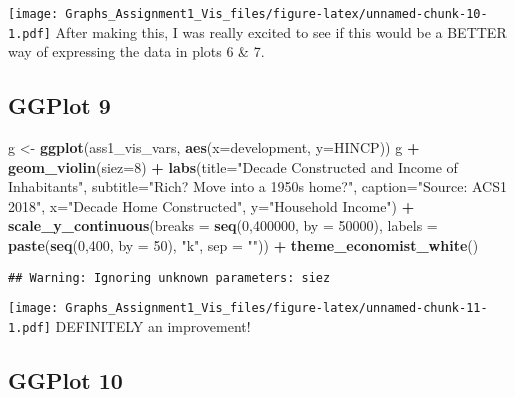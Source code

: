 \documentclass[
]{article}
\newenvironment{Shaded}{\begin{snugshade}}{\end{snugshade}}
\newcommand{\DataTypeTok}[1]{\textcolor[rgb]{0.13,0.29,0.53}{#1}}
\newcommand{\DecValTok}[1]{\textcolor[rgb]{0.00,0.00,0.81}{#1}}
\newcommand{\KeywordTok}[1]{\textcolor[rgb]{0.13,0.29,0.53}{\textbf{#1}}}
\newcommand{\NormalTok}[1]{#1}
\newcommand{\OperatorTok}[1]{\textcolor[rgb]{0.81,0.36,0.00}{\textbf{#1}}}
\newcommand{\StringTok}[1]{\textcolor[rgb]{0.31,0.60,0.02}{#1}}
\begin{document}
\texttt{[image: Graphs\_Assignment1\_Vis\_files/figure-latex/unnamed-chunk-10-1.pdf]}
After making this, I was really excited to see if this would be a BETTER
way of expressing the data in plots 6 \& 7.

\hypertarget{ggplot-9}{%
\subsection{GGPlot 9}\label{ggplot-9}}

\begin{Shaded}
\begin{Highlighting}[]
\NormalTok{g <-}\StringTok{ }\KeywordTok{ggplot}\NormalTok{(ass1_vis_vars, }\KeywordTok{aes}\NormalTok{(}\DataTypeTok{x=}\NormalTok{development, }\DataTypeTok{y=}\NormalTok{HINCP))}
\NormalTok{g }\OperatorTok{+}\StringTok{ }\KeywordTok{geom_violin}\NormalTok{(}\DataTypeTok{siez=}\DecValTok{8}\NormalTok{) }\OperatorTok{+}\StringTok{ }
\StringTok{  }\KeywordTok{labs}\NormalTok{(}\DataTypeTok{title=}\StringTok{"Decade Constructed and Income of Inhabitants"}\NormalTok{, }
       \DataTypeTok{subtitle=}\StringTok{"Rich? Move into a 1950s home?"}\NormalTok{,}
       \DataTypeTok{caption=}\StringTok{"Source: ACS1 2018"}\NormalTok{,}
       \DataTypeTok{x=}\StringTok{"Decade Home Constructed"}\NormalTok{,}
       \DataTypeTok{y=}\StringTok{"Household Income"}\NormalTok{) }\OperatorTok{+}
\StringTok{  }\KeywordTok{scale_y_continuous}\NormalTok{(}\DataTypeTok{breaks =} \KeywordTok{seq}\NormalTok{(}\DecValTok{0}\NormalTok{,}\DecValTok{400000}\NormalTok{, }\DataTypeTok{by =} \DecValTok{50000}\NormalTok{),}
                     \DataTypeTok{labels =} \KeywordTok{paste}\NormalTok{(}\KeywordTok{seq}\NormalTok{(}\DecValTok{0}\NormalTok{,}\DecValTok{400}\NormalTok{, }\DataTypeTok{by =} \DecValTok{50}\NormalTok{),}
                     \StringTok{"k"}\NormalTok{, }\DataTypeTok{sep =} \StringTok{""}\NormalTok{)) }\OperatorTok{+}
\StringTok{  }\KeywordTok{theme_economist_white}\NormalTok{()}
\end{Highlighting}
\end{Shaded}

\begin{verbatim}
## Warning: Ignoring unknown parameters: siez
\end{verbatim}

\texttt{[image: Graphs\_Assignment1\_Vis\_files/figure-latex/unnamed-chunk-11-1.pdf]}
DEFINITELY an improvement!

\hypertarget{ggplot-10}{%
\subsection{GGPlot 10}\label{ggplot-10}}
\end{document}
